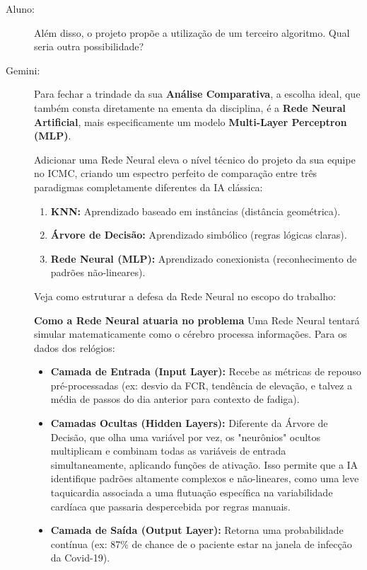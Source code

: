 \begin{description}
    \item[Aluno:] Além disso, o projeto propõe a utilização de um terceiro algoritmo. Qual seria outra possibilidade?

    \item[Gemini:] Para fechar a trindade da sua \textbf{Análise Comparativa}, a escolha ideal, que também consta diretamente na ementa da disciplina, é a \textbf{Rede Neural Artificial}, mais especificamente um modelo \textbf{Multi-Layer Perceptron (MLP)}.

    Adicionar uma Rede Neural eleva o nível técnico do projeto da sua equipe no ICMC, criando um espectro perfeito de comparação entre três paradigmas completamente diferentes da IA clássica:

    \begin{enumerate}
        \item \textbf{KNN:} Aprendizado baseado em instâncias (distância geométrica).
        \item \textbf{Árvore de Decisão:} Aprendizado simbólico (regras lógicas claras).
        \item \textbf{Rede Neural (MLP):} Aprendizado conexionista (reconhecimento de padrões não-lineares).
    \end{enumerate}

    Veja como estruturar a defesa da Rede Neural no escopo do trabalho:

    \textbf{Como a Rede Neural atuaria no problema}
    Uma Rede Neural tentará simular matematicamente como o cérebro processa informações. Para os dados dos relógios:

    \begin{itemize}
        \item \textbf{Camada de Entrada (Input Layer):} Recebe as métricas de repouso pré-processadas (ex: desvio da FCR, tendência de elevação, e talvez a média de passos do dia anterior para contexto de fadiga).
        \item \textbf{Camadas Ocultas (Hidden Layers):} Diferente da Árvore de Decisão, que olha uma variável por vez, os "neurônios" ocultos multiplicam e combinam todas as variáveis de entrada simultaneamente, aplicando funções de ativação. Isso permite que a IA identifique padrões altamente complexos e não-lineares, como uma leve taquicardia associada a uma flutuação específica na variabilidade cardíaca que passaria despercebida por regras manuais.
        \item \textbf{Camada de Saída (Output Layer):} Retorna uma probabilidade contínua (ex: 87\% de chance de o paciente estar na janela de infecção da Covid-19).
    \end{itemize}


\end{description}
